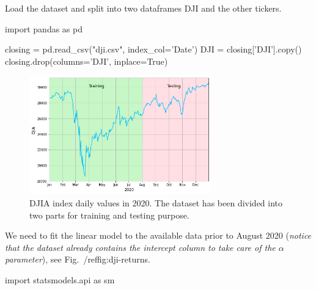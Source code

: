 \cprotEnv\begin{solution}
Load the dataset and split into two dataframes DJI and the other tickers.
\begin{ipython}
import pandas as pd

closing = pd.read_csv("dji.csv", index_col='Date')
DJI = closing['DJI'].copy()
closing.drop(columns='DJI', inplace=True)
\end{ipython} 
	
\begin{figure}[htbp]
\centering
\includegraphics[width=0.7\textwidth]{figures/dji}
\caption{DJIA index daily values in 2020. The dataset has been divided into two parts for training and testing purpose.}
\label{fig:dji-returns}
\end{figure}
	
We need to fit the linear model to the available data prior to August 2020 (\emph{notice that the dataset already contains the intercept column to take care of the $\alpha$ parameter}), see Fig.~/ref{fig:dji-returns}.
\begin{ipython}
import statsmodels.api as sm


\end{ipython}
\end{solution}
